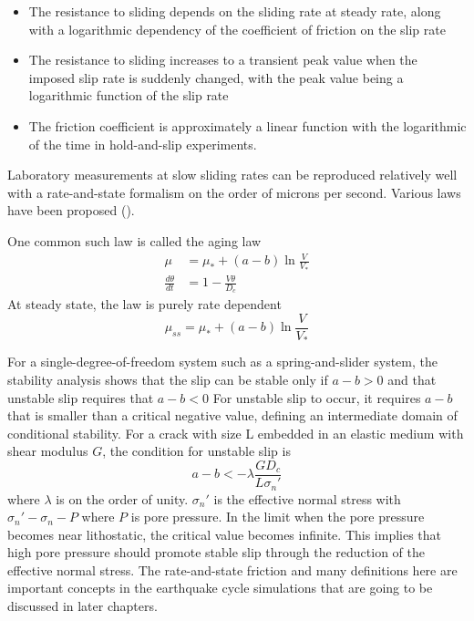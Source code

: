\begin{itemize}
    \item The resistance to sliding depends on the sliding rate at steady rate, along with a logarithmic dependency of the coefficient of friction on the slip rate
    \item The resistance to sliding increases to a transient peak value when the imposed slip rate is suddenly changed, with the peak value being a logarithmic function of the slip rate
    \item The friction coefficient is approximately a linear function with the logarithmic of the time in hold-and-slip experiments.
\end{itemize}

Laboratory measurements at slow sliding rates can be reproduced relatively well with a rate-and-state formalism on the order of microns per second.
Various laws have been proposed (\cite{https://doi.org/10.1029/JB084iB05p02161, https://doi.org/10.1029/JB084iB05p02169,https://doi.org/10.1029/JB088iB12p10359,annurev:/content/journals/10.1146/annurev.earth.26.1.643}).

One common such law is called the aging law
\begin{align}
    \mu &= \mu_* + (a - b) \ln \frac{V}{V_*} \\
    \frac{d\theta}{dt} &= 1 - \frac{V\theta}{D_c}
\end{align}
At steady state, the law is purely rate dependent
\begin{equation}
    \mu_{ss} = \mu_{*} + (a - b) \ln \frac{V}{V_*}
\end{equation}

For a single-degree-of-freedom system such as a spring-and-slider system, the stability analysis shows that the slip can be stable only if $a - b > 0$ and that unstable slip requires that $a - b < 0$  
For unstable slip to occur, it requires $a - b$ that is smaller than a critical negative value, defining an intermediate domain of conditional stability.
For a crack with size L embedded in an elastic medium with shear modulus $G$, the condition for unstable slip is 
\begin{equation}
    a - b < - \lambda \frac{GD_c}{L\sigma_n'}
\end{equation}
where $\lambda$ is on the order of unity. 
$\sigma_n'$ is the effective normal stress with $\sigma_n' - \sigma_n - P$ where $P$ is pore pressure.
In the limit when the pore pressure becomes near lithostatic, the critical value becomes infinite.
This implies that high pore pressure should promote stable slip through the reduction of the effective normal stress.
The rate-and-state friction and many definitions here are important concepts in the earthquake cycle simulations that are going to be discussed in later chapters.

\cite{}